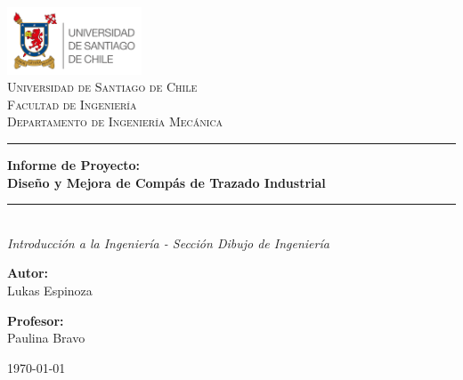 \documentclass[11pt, a4paper]{article}
\begin{document}
\begin{titlepage}
    \centering
    \includegraphics[width=4cm]{usach.png}\\[2cm]
    \textsc{\LARGE Universidad de Santiago de Chile}\\[0.5cm]
    \textsc{\Large Facultad de Ingeniería}\\[0.5cm]
    \textsc{\Large Departamento de Ingeniería Mecánica}\\[2.5cm]
    
    \rule{\textwidth}{1.5pt}\vspace{0.4cm}
    {\Huge \bfseries Informe de Proyecto: \\[0.5cm] Diseño y Mejora de Compás de Trazado Industrial}\\[0.4cm]
    \rule{\textwidth}{1.5pt}\\[1.5cm]
    
    {\Large \textit{Introducción a la Ingeniería - Sección Dibujo de Ingeniería}}\\[2cm]
    
    \begin{minipage}{0.4\textwidth}
        \begin{flushleft} \large
            \textbf{Autor:}\\
            Lukas Espinoza
        \end{flushleft}
    \end{minipage}
    \begin{minipage}{0.4\textwidth}
        \begin{flushright} \large
            \textbf{Profesor:}\\
            Paulina Bravo
        \end{flushright}
    \end{minipage}

    \vfill %
    
    {\large \today}
\end{titlepage}
\end{document}
